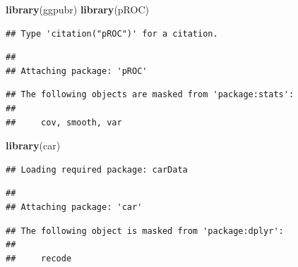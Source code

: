 \documentclass[
]{article}
\newenvironment{Shaded}{\begin{snugshade}}{\end{snugshade}}
\newcommand{\FunctionTok}[1]{\textcolor[rgb]{0.13,0.29,0.53}{\textbf{#1}}}
\newcommand{\NormalTok}[1]{#1}
\begin{document}
\begin{Shaded}
\begin{Highlighting}[]
\FunctionTok{library}\NormalTok{(ggpubr)}
\FunctionTok{library}\NormalTok{(pROC)}
\end{Highlighting}
\end{Shaded}

\begin{verbatim}
## Type 'citation("pROC")' for a citation.
\end{verbatim}

\begin{verbatim}
## 
## Attaching package: 'pROC'
\end{verbatim}

\begin{verbatim}
## The following objects are masked from 'package:stats':
## 
##     cov, smooth, var
\end{verbatim}

\begin{Shaded}
\begin{Highlighting}[]
\FunctionTok{library}\NormalTok{(car)  }
\end{Highlighting}
\end{Shaded}

\begin{verbatim}
## Loading required package: carData
\end{verbatim}

\begin{verbatim}
## 
## Attaching package: 'car'
\end{verbatim}

\begin{verbatim}
## The following object is masked from 'package:dplyr':
## 
##     recode
\end{verbatim}
\end{document}
